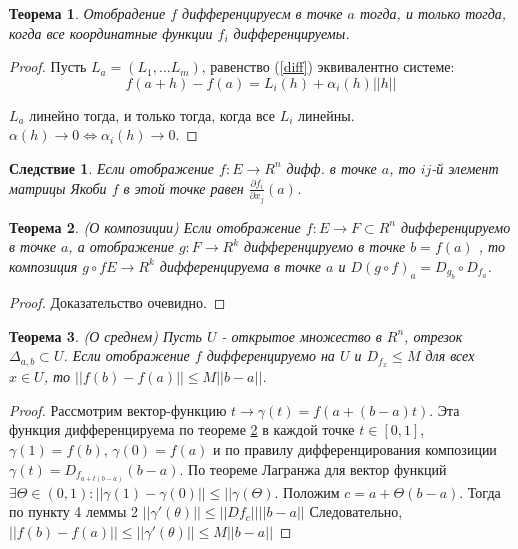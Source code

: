 \documentclass{article}
\newtheorem{teo}{Теорема}
\newtheorem*{cor}{Следствие}
\begin{document}
  \begin{teo} Отобрадение $f$ дифференцируесм в точке $a$ тогда, и только тогда, когда все координатные функции $f_i$ дифференцируемы.
  \end{teo}
  \begin{proof}
  Пусть $L_a = (L_1, \ldots L_m)$, равенство (\ref{diff}) эквивалентно системе:
  $$ f(a + h) - f(a) = L_i(h) + \alpha_i(h)||h||$$
   
  $L_a$ линейно тогда, и только тогда, когда все $L_i$ линейны. $\alpha(h) \rightarrow 0 \Leftrightarrow \alpha_i(h)  \rightarrow 0 $.
  \end{proof}
  
  \begin{cor} 
  Если отображение $f: E \rightarrow R^n$ дифф. в точке $a$, то $ij$-й элемент матрицы Якоби $f$ в этой точке равен $ \frac{\partial f_i}{\partial x_j}(a) $.
  \end{cor}
  
  \begin{teo}{(О композиции)}
  \label{composition}
  Если отображение $f: E \rightarrow F \subset R^n $ дифференцируемо в точке $a$, а отображение $g: F \rightarrow R^k $ дифференцируемо в точке $b = f(a)$ , то композиция $g \circ f E \rightarrow R^k $ дифференцируема в точке $a$ и $ D(g \circ f)_a = D_{g_b} \circ D_{f_a} $.
  \end{teo}   
  \begin{proof}
  Доказательство очевидно.
  \end{proof}
  
  \begin{teo}{(О среднем)} Пусть $U$ - открытое множество в $R^n$, отрезок $\Delta_{a, b} \subset U$. Если отображение  $f$ дифференцируемо на $U$ и $D_{f_x} \leqslant M$ для всех $ x \in U $, то $||f(b) - f(a)||\leqslant M||b - a||$.
  \end{teo}
  \begin{proof}
  Рассмотрим вектор-функцию $t \rightarrow \gamma(t) = f(a + (b - a)t) $. Эта функция дифференцируема по теореме {\ref{composition}} в каждой точке $ t \in [0, 1] $, $\gamma(1) = f(b)$, $\gamma(0) = f(a)$ и по правилу дифференцирования композиции $\gamma(t) = D_{f_{a + t(b - a)}} (b - a)$. 
   По теореме Лагранжа для вектор функций $\exists \Theta \in (0, 1) :||\gamma(1) - \gamma(0)||\leqslant||\gamma(\Theta) $. Положим $ c = a + \Theta(b-a)$. Тогда по пункту 4 леммы 2 $ ||\gamma'(\theta)|| \leqslant ||Df_c||||b-a|| $ Следовательно, $||f(b) - f(a)|| \leqslant ||\gamma'(\theta)|| \leqslant M||b - a|| $
  \end{proof}
  
\end{document}
